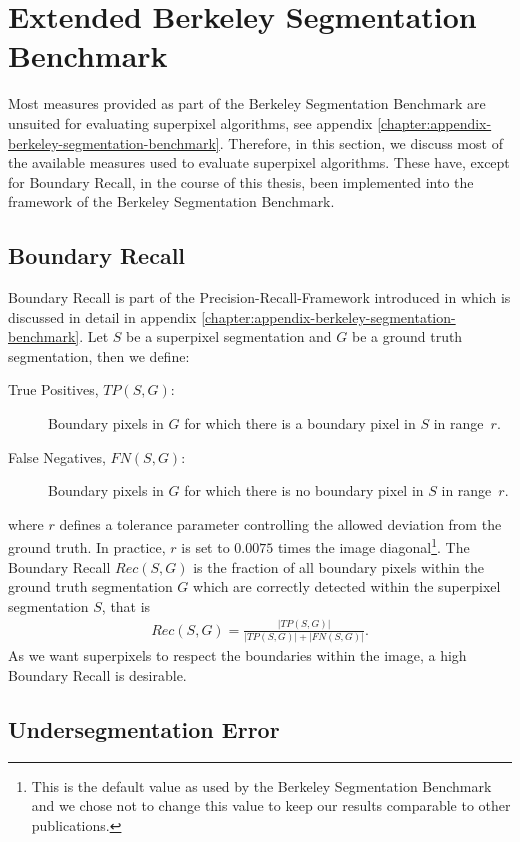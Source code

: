 \section{Extended Berkeley Segmentation Benchmark}
\label{section:datasets-extended-berkeley-segmentation-benchmark}

Most measures provided as part of the Berkeley Segmentation Benchmark are unsuited for evaluating superpixel algorithms, see appendix \ref{chapter:appendix-berkeley-segmentation-benchmark}. Therefore, in this section, we discuss most of the available measures used to evaluate superpixel algorithms. These have, except for Boundary Recall, in the course of this thesis, been implemented into the framework of the Berkeley Segmentation Benchmark.

\subsection{Boundary Recall}

Boundary Recall is part of the Precision-Recall-Framework introduced in \cite{MartinFowlkesMalik:2004} which is discussed in detail in appendix \ref{chapter:appendix-berkeley-segmentation-benchmark}. Let $S$ be a superpixel segmentation and $G$ be a ground truth segmentation, then we define:
\begin{description}
 	\item[True Positives, $TP(S, G)$:] Boundary pixels in $G$ for which there is a boundary pixel in $S$ in range~$r$.
	\item[False Negatives, $FN(S, G)$:] Boundary pixels in $G$ for which there is no boundary pixel in $S$ in range~$r$.
\end{description}
where $r$ defines a tolerance parameter controlling the allowed deviation from the ground truth. In practice, $r$ is set to $0.0075$ times the image diagonal\footnote{This is the default value as used by the Berkeley Segmentation Benchmark and we chose not to change this value to keep our results comparable to other publications.}.
The Boundary Recall $Rec(S,G)$ is the fraction of all boundary pixels within the ground truth segmentation $G$ which are correctly detected within the superpixel segmentation $S$, that is
\begin{align}
	Rec(S,G) = \frac{|TP(S,G)|}{|TP(S,G)| + |FN(S,G)|}.
\end{align}
As we want superpixels to respect the boundaries within the image, a high Boundary Recall is desirable.

\subsection{Undersegmentation Error}
\label{subsection:datasets-extended-berkeley-segmentation-benchmark-undersegmentation-error}

